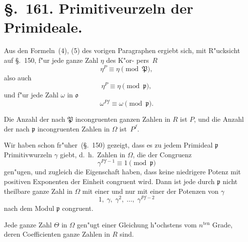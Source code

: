 \documentclass[12pt,a4paper]{article}
\theoremstyle{weber}
\begin{document}
\newpage
\section*{\S.~161. Primitiveurzeln der Primideale.}

Aus den Formeln~(4), (5) des vorigen Paragraphen ergiebt
sich, mit R"ucksicht auf \S.~150, f"ur jede ganze Zahl $\eta$ des K"or-
pers~$R$
\[
\eta^P \equiv \eta \pmod{\mathfrak{P}},
\]
also auch
\begin{equation}\label{eq:s161-1}
\eta^P \equiv \eta \pmod{\mathfrak{p}},
\end{equation}
und f"ur jede Zahl $\omega$ in $\mathfrak{o}$
\begin{equation}\label{eq:s161-2}
\omega^{Pf} \equiv \omega \pmod{\mathfrak{p}}.
\end{equation}

Die Anzahl der nach $\mathfrak{P}$ incongruenten ganzen Zahlen in $R$
ist $P$, und die Anzahl der nach $\mathfrak{p}$ incongruenten Zahlen in $\varOmega$
ist~$P^f$.

Wir haben schon fr"uher~(\S.~150) gezeigt, dass es zu jedem
Primideal $\mathfrak{p}$ Primitivwurzeln $\gamma$ giebt, d.~h.\ Zahlen in $\varOmega$, die
der Congruenz
\begin{equation}\label{eq:s161-3}
\gamma^{Pf-1} \equiv 1 \pmod{\mathfrak{p}}
\end{equation}
gen"ugen, und zugleich die Eigenschaft haben, dass keine niedrigere
Potenz mit positiven Exponenten der Einheit congruent wird.
Dann ist jede durch $\mathfrak{p}$ nicht theilbare ganze Zahl in $\varOmega$ mit einer
und nur mit einer der Potenzen von $\gamma$
\begin{equation}\label{eq:s161-4}
1,\; \gamma,\; \gamma^2,\; \dots,\; \gamma^{Pf-2}
\end{equation}
nach dem Modul $\mathfrak{p}$ congruent.

Jede ganze Zahl $\varTheta$ in $\varOmega$ gen"ugt einer Gleichung h"ochstens
vom $n^{\mathrm{ten}}$ Grade, deren Coefficienten ganze Zahlen in $R$ sind.
\end{document}

